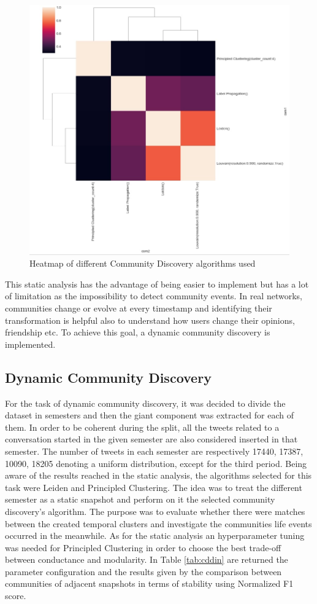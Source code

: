 \documentclass[sigchi]{acmart}
\begin{document}
 \begin{figure}[h]
     \centering
     \includegraphics[width=0.75\columnwidth]{report/img/heatmap.jpeg}
     \caption{Heatmap of different Community Discovery algorithms used}
     \label{fig:cd}
 \end{figure}
 
This static analysis has the advantage of being easier to implement but has a lot of limitation as the impossibility to detect community events. In real networks, communities change or evolve at every timestamp and identifying their transformation is helpful also to understand how users change their opinions, friendship etc. To achieve this goal, a dynamic community discovery is implemented.

\subsection{Dynamic Community Discovery}

For the task of dynamic community discovery, it was decided to divide the dataset in semesters and then the giant component was extracted for each of them. In order to be coherent during the split, all the tweets related to a conversation started in the given semester are also considered inserted in that semester. 
The number of tweets in each semester are respectively 17440, 17387, 10090, 18205 denoting a uniform distribution, except for the third period. Being aware of the results reached in the static analysis, the algorithms selected for this task were Leiden and Principled Clustering. The idea was to treat the different semester as a static snapshot and perform on it the selected community discovery’s algorithm. The purpose was to evaluate whether there were matches between the created temporal clusters and investigate the communities life events occurred in the meanwhile.
As for the static analysis an hyperparameter tuning was needed for Principled Clustering in order to choose the best trade-off between conductance and modularity. In Table \ref{tab:cddin} are returned the parameter configuration and the results given by the comparison between communities of adjacent snapshots in terms of stability using Normalized F1 score.
\end{document}

